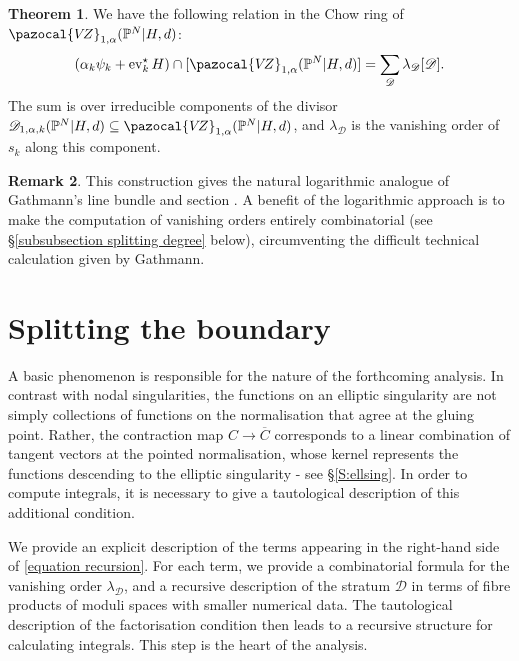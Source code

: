 \documentclass[11pt]{amsart}
\newcommand{\PP}{\mathbb P}
\newcommand{\VZ}{\pazocal{V\!Z}}
\newcommand{\st}{\star}
\renewcommand{\to}{\rightarrow}
\newcommand{\ev}{\operatorname{ev}}
\newcommand{\Dcal}{\mathcal{D}}
\theoremstyle{definition}
\newtheorem{thm}{Theorem}[section]
\theoremstyle{definition}
\newtheorem{remark}[thm]{Remark}
\begin{document}
\begin{thm} \label{theorem recursion} We have the following relation in the Chow ring of $\VZ_{1,\alpha}(\PP^N|H,d)$:
\begin{equation}\label{equation recursion} (\alpha_k \psi_k + \ev_k^\st H) \cap [\VZ_{1,\alpha}(\PP^N|H,d)] = \sum_{\Dcal} \lambda_\Dcal [ \Dcal ].\end{equation}
The sum is over irreducible components of the divisor $\Dcal_{1,\alpha,k}(\PP^N|H,d) \subseteq \VZ_{1,\alpha}(\PP^N|H,d)$, and $\lambda_\Dcal$ is the vanishing order of $s_k$ along this component. \end{thm}

\begin{remark} This construction gives the natural logarithmic analogue of Gathmann's line bundle and section \cite[Construction 2.1]{Ga}. A benefit of the logarithmic approach is to make the computation of vanishing orders entirely combinatorial (see \S \ref{subsubsection splitting degree} below), circumventing the difficult technical calculation given by Gathmann. \end{remark}

\section{Splitting the boundary}\label{section reduced splitting}

A basic phenomenon is responsible for the nature of the forthcoming analysis. In contrast with nodal singularities, the functions on an elliptic singularity are not simply collections of functions on the normalisation that agree at the gluing point. Rather, the contraction map $C\to\overline C$ corresponds to a linear combination of tangent vectors at the pointed normalisation, whose kernel represents the functions descending to the elliptic singularity - see \S \ref{S:ellsing}. In order to compute integrals, it is necessary to give a tautological description of this additional condition. %

We provide an explicit description of the terms appearing in the right-hand side of \eqref{equation recursion}.  For each term, we provide a combinatorial formula for the vanishing order $\lambda_\Dcal$, and a recursive description of the stratum $\Dcal$ 
in terms of fibre products of moduli spaces with smaller numerical data. The tautological description of the factorisation condition then leads to a recursive structure for calculating integrals. This step is the heart of the analysis. 
\end{document}
